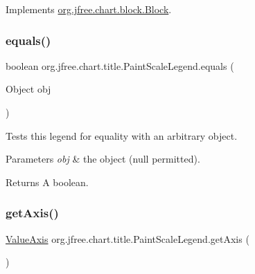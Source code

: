 Implements \mbox{\hyperlink{interfaceorg_1_1jfree_1_1chart_1_1block_1_1_block_a1bac635d72de5ca6a71eff63dabf77a4}{org.\+jfree.\+chart.\+block.\+Block}}.

\mbox{\label{classorg_1_1jfree_1_1chart_1_1title_1_1_paint_scale_legend_af5fb515da90fde42d1ef84914a2ae494}} 
\subsubsection{\texorpdfstring{equals()}{equals()}}
{\footnotesize\ttfamily boolean org.\+jfree.\+chart.\+title.\+Paint\+Scale\+Legend.\+equals (\begin{DoxyParamCaption}\item[{Object}]{obj }\end{DoxyParamCaption})}

Tests this legend for equality with an arbitrary object.


\begin{DoxyParams}{Parameters}
{\em obj} & the object ({\ttfamily null} permitted).\\
\hline
\end{DoxyParams}
\begin{DoxyReturn}{Returns}
A boolean. 
\end{DoxyReturn}
\mbox{\label{classorg_1_1jfree_1_1chart_1_1title_1_1_paint_scale_legend_a3bbd4958868cd03068068dd6c098df50}} 
\subsubsection{\texorpdfstring{get\+Axis()}{getAxis()}}
{\footnotesize\ttfamily \mbox{\hyperlink{classorg_1_1jfree_1_1chart_1_1axis_1_1_value_axis}{Value\+Axis}} org.\+jfree.\+chart.\+title.\+Paint\+Scale\+Legend.\+get\+Axis (\begin{DoxyParamCaption}{ }\end{DoxyParamCaption})}

